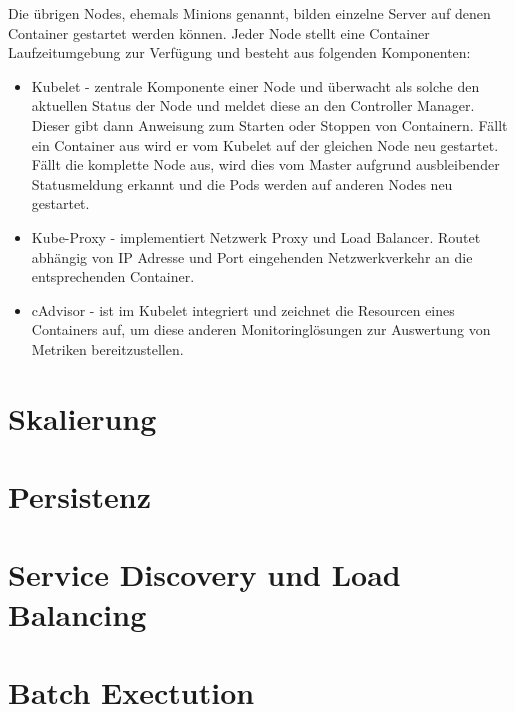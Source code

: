 Die übrigen Nodes, ehemals Minions genannt, bilden einzelne Server auf denen Container gestartet werden können. Jeder Node stellt eine Container Laufzeitumgebung zur Verfügung und besteht aus folgenden Komponenten:
\begin{itemize}
	\item Kubelet - zentrale Komponente einer Node und überwacht als solche den aktuellen Status der Node und meldet diese an den Controller Manager. Dieser gibt dann Anweisung zum Starten oder Stoppen von Containern. Fällt ein Container aus wird er vom Kubelet auf der gleichen Node neu gestartet. Fällt die komplette Node aus, wird dies vom Master aufgrund ausbleibender Statusmeldung erkannt und die Pods werden auf anderen Nodes neu gestartet.
	\item Kube-Proxy - implementiert Netzwerk Proxy und Load Balancer. Routet abhängig von IP Adresse und Port eingehenden Netzwerkverkehr an die entsprechenden Container.
	\item cAdvisor - ist im Kubelet integriert und zeichnet die Resourcen eines Containers auf, um diese anderen Monitoringlösungen zur Auswertung von Metriken bereitzustellen.
\end{itemize}
\section{Skalierung}

\section{Persistenz}

\section{Service Discovery und Load Balancing}

\section{Batch Exectution}